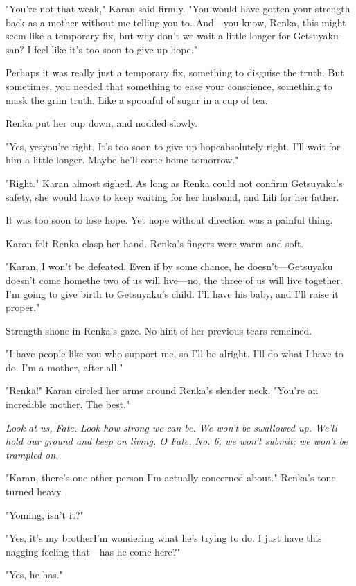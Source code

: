 "You're not that weak," Karan said firmly. "You would have gotten your
strength back as a mother without me telling you to. And---you know,
Renka, this might seem like a temporary fix, but why don't we wait a
little longer for Getsuyaku-san? I feel like it's too soon to give up
hope."

Perhaps it was really just a temporary fix, something to disguise the
truth. But sometimes, you needed that something to ease your conscience,
something to mask the grim truth. Like a spoonful of sugar in a cup of
tea.

Renka put her cup down, and nodded slowly.

"Yes, yes\el you're right. It's too soon to give up hope\el absolutely
right. I'll wait for him a little longer. Maybe he'll come home
tomorrow."

"Right." Karan almost sighed. As long as Renka could not confirm
Getsuyaku's safety, she would have to keep waiting for her husband, and
Lili for her father.

It was too soon to lose hope. Yet hope without direction was a painful
thing.

Karan felt Renka clasp her hand. Renka's fingers were warm and soft.

"Karan, I won't be defeated. Even if by some chance, he
doesn't---Getsuyaku doesn't come home\el the two of us will live---no, the
three of us will live together. I'm going to give birth to Getsuyaku's
child. I'll have his baby, and I'll raise it proper."

Strength shone in Renka's gaze. No hint of her previous tears remained.

"I have people like you who support me, so I'll be alright. I'll do what
I have to do. I'm a mother, after all."

"Renka!" Karan circled her arms around Renka's slender neck. "You're an
incredible mother. The best."

\emph{Look at us, Fate. Look how strong we can be. We won't be swallowed up.
We'll hold our ground and keep on living. O Fate, No. 6, we won't
submit; we won't be trampled on.}

"Karan, there's one other person I'm actually concerned about." Renka's
tone turned heavy.

"Yoming, isn't it?"

"Yes, it's my brother\el I'm wondering what he's trying to do. I just
have this nagging feeling that---has he come here?"

"Yes, he has."

